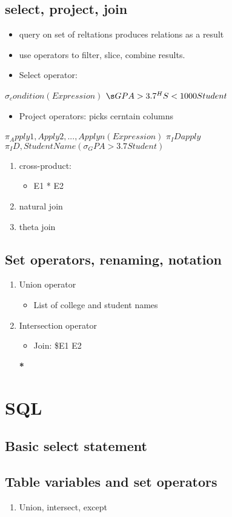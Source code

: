 \documentclass[11pt]{article}
\begin{document}
\subsection{select, project, join}
\label{sec:orgheadline8}
\begin{itemize}
\item query on set of reltations produces relations as a result
\item use operators to filter, slice, combine results.
\item Select operator:
\end{itemize}
\(\sigma_condition(Expression)\)
\(\s GPA > 3.7 ^ HS < 1000 Student\)
\begin{itemize}
\item Project operators: picks cerntain columns
\end{itemize}
\(\pi_Apply1,Apply2,...,Applyn(Expression)\)
\(\pi_ID apply\)
\(\pi_ID,StudentName(\sigma_GPA > 3.7 Student)\)
\begin{enumerate}
\item cross-product:
\label{sec:orgheadline5}
\begin{itemize}
\item E1 * E2
\end{itemize}
\item natural join
\label{sec:orgheadline6}
\item theta join
\label{sec:orgheadline7}
\end{enumerate}
\subsection{Set operators, renaming, notation}
\label{sec:orgheadline11}
\begin{enumerate}
\item Union operator
\label{sec:orgheadline9}
\begin{itemize}
\item List of college and student names
\end{itemize}
\item Intersection operator
\label{sec:orgheadline10}
\begin{itemize}
\item Join:
\$E1 \join E2
\end{itemize}
\textbf{*}
\end{enumerate}
\section{SQL}
\label{sec:orgheadline16}
\subsection{Basic select statement}
\label{sec:orgheadline13}
\subsection{Table variables and set operators}
\label{sec:orgheadline15}
\begin{enumerate}
\item Union, intersect, except
\label{sec:orgheadline14}
\end{enumerate}
\end{document}
